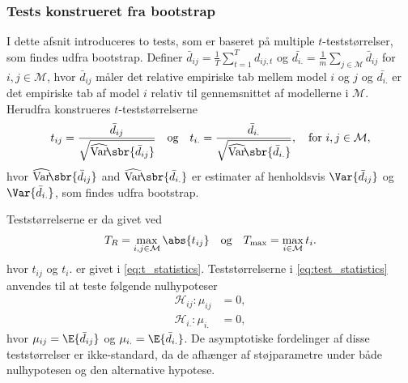 \subsubsection{Tests konstrueret fra bootstrap}
I dette afsnit introduceres to tests, som er baseret på multiple \(t\)-teststørrelser, som findes udfra bootstrap.
Definer \(\bar{d}_{ij} = \frac{1}{T} \sum_{t = 1}^T d_{ij,t}\) og \(\bar{d_{i.}} = \frac{1}{m} \sum_{j \in \mathcal{M}} \bar{d}_{ij}\) for \(i,j \in \mathcal{M}\), hvor \(\bar{d}_{ij}\) måler det relative empiriske tab mellem model \(i\) og \(j\) og \(\bar{d_{i.}}\) er det empiriske tab af model \(i\) relativ til gennemsnittet af modellerne i \(\mathcal{M}\). 
Herudfra konstrueres \(t\)-teststørrelserne
\begin{align}
t_{ij} = \frac{\bar{d}_{ij}}{\sqrt{\widehat{\mathrm{Var}}\!\sbr{\bar{d}_{ij}}}} \quad \text{og} \quad t_{i.} = \frac{\bar{d}_{i.}}{\sqrt{\widehat{\mathrm{Var}}\!\sbr{\bar{d}_{i.}}}}, \quad \text{for } i,j \in \mathcal{M}, \label{eq:t_statistics}
\end{align}
hvor \(\widehat{\mathrm{Var}}\!\sbr{\bar{d}_{ij}}\) and \(\widehat{\mathrm{Var}}\!\sbr{\bar{d}_{i.}}\) er estimater af henholdsvis \(\Var{\bar{d}_{ij}}\) og \(\Var{\bar{d}_{i.}}\), som findes udfra bootstrap.

Teststørrelserne er da givet ved
\begin{align} 
T_R = \max_{i,j \in \mathcal{M}} \abs{t_{ij}} \quad \text{og} \quad T_{\text{max}} = \max_{i \in \mathcal{M}} t_i. \label{eq:test_statistics}
\end{align}
hvor \(t_{ij}\) og \(t_i.\) er givet i \eqref{eq:t_statistics}.
Teststørrelserne i \eqref{eq:test_statistics} anvendes til at teste følgende nulhypoteser
\begin{align*}
\mathcal{H}_{ij}:\mu_{ij}&=0, \\
\mathcal{H}_{i.} : \mu_{i.}&=0,
\end{align*}
hvor \(\mu_{ij} = \E{\bar{d}_{ij}}\) og \(\mu_{i.} = \E{\bar{d}_{i.}}\).
De asymptotiske fordelinger af disse teststørrelser er ikke-standard, da de afhænger af støjparametre under både nulhypotesen og den alternative hypotese.
